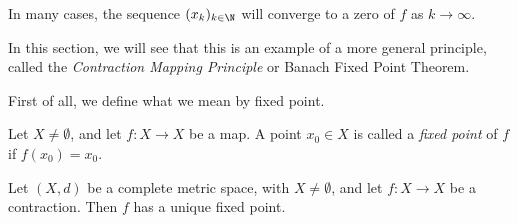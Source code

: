 In many cases, the sequence $(x_k)_{k \in \N}$ will converge to a zero of $f$ as $k \to \infty$.


In this section, we will see that this is an example of a more general principle,
called the \emph{Contraction Mapping Principle} or Banach Fixed Point Theorem. 



\bis 

First of all, we define what we mean by fixed point.


\begin{definition}
Let $X\neq \emptyset$, and let $f : X \to X$ be a map. A point $x_0 \in X$ is called a \emph{fixed point}
of $f$ if $f(x_0) = x_0$.
\end{definition}

\begin{theorem} \label{thm:contraction}
Let $(X,d)$ be a complete metric space, with $X\neq \emptyset$, and let $f : X \to X$ be a contraction. Then $f$ has a unique fixed point.
\end{theorem}

\np

